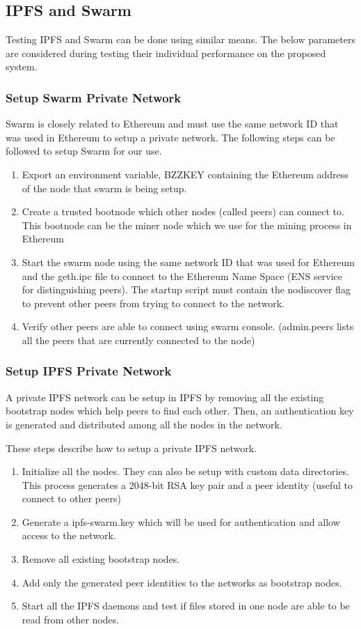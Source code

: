 \documentclass[11pt,openright]{report}
\begin{document}
\subsection{IPFS and Swarm}
Testing IPFS and Swarm can be done using similar means. The below parameters are considered during testing their individual performance on the proposed system. 

\subsubsection{Setup Swarm Private Network}
Swarm is closely related to Ethereum and must use the same network ID that was used in Ethereum to setup a private network.
The following steps can be followed to setup Swarm for our use.
\begin{enumerate}
    \item Export an environment variable, BZZKEY containing the Ethereum address of the node that swarm is being setup.
    \item Create a trusted bootnode which other nodes (called peers) can connect to. This bootnode can be the miner node which we use for the mining process in Ethereum
    \item Start the swarm node using the same network ID that was used for Ethereum and the geth.ipc file to connect to the Ethereum Name Space (ENS service for distinguishing peers). The startup script must contain the nodiscover flag to prevent other peers from trying to connect to the network.
    \item Verify other peers are able to connect using swarm console. (admin.peers lists all the peers that are currently connected to the node)
\end{enumerate}

\subsubsection{Setup IPFS Private Network}
A private IPFS network can be setup in IPFS by removing all the existing bootstrap nodes which help peers to find each other. Then, an authentication key is generated and distributed among all the nodes in the network.

These steps describe how to setup a private IPFS network.
\begin{enumerate}
    \item Initialize all the nodes. They can also be setup with custom data directories. This process generates a 2048-bit RSA key pair and a peer identity (useful to connect to other peers)
    \item Generate a ipfs-swarm.key which will be used for authentication and allow access to the network.
    \item Remove all existing bootstrap nodes.
    \item Add only the generated peer identities to the networks as bootstrap nodes.
    \item Start all the IPFS daemons and test if files stored in one node are able to be read from other nodes.
\end{enumerate}
\end{document}
